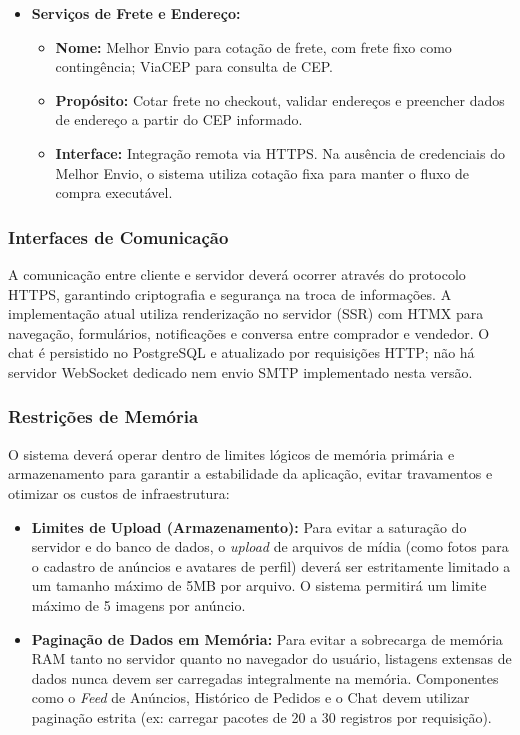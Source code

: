 ﻿\documentclass[12pt,a4paper]{article}
\begin{document}
\begin{itemize}
    \vspace{0.5em}

    \item \textbf{Serviços de Frete e Endereço:}
    \begin{itemize}
        \item[ ] \textbf{Nome:} Melhor Envio para cotação de frete, com frete fixo como contingência; ViaCEP para consulta de CEP.
        \item[ ] \textbf{Propósito:} Cotar frete no checkout, validar endereços e preencher dados de endereço a partir do CEP informado.
        \item[ ] \textbf{Interface:} Integração remota via HTTPS. Na ausência de credenciais do Melhor Envio, o sistema utiliza cotação fixa para manter o fluxo de compra executável.
    \end{itemize}
\end{itemize}

\subsubsection{Interfaces de Comunicação}
\label{sec:InterfaceComunicacao}

A comunicação entre cliente e servidor deverá ocorrer através do protocolo HTTPS, garantindo criptografia e segurança na troca de informações. A implementação atual utiliza renderização no servidor (SSR) com HTMX para navegação, formulários, notificações e conversa entre comprador e vendedor. O chat é persistido no PostgreSQL e atualizado por requisições HTTP; não há servidor WebSocket dedicado nem envio SMTP implementado nesta versão.

\subsubsection{Restrições de Memória}
\label{sec:RestricoesMemoria}

O sistema deverá operar dentro de limites lógicos de memória primária e armazenamento para garantir a estabilidade da aplicação, evitar travamentos e otimizar os custos de infraestrutura:

\begin{itemize}
    \item \textbf{Limites de Upload (Armazenamento):} Para evitar a saturação do servidor e do banco de dados, o \textit{upload} de arquivos de mídia (como fotos para o cadastro de anúncios e avatares de perfil) deverá ser estritamente limitado a um tamanho máximo de 5MB por arquivo. O sistema permitirá um limite máximo de 5 imagens por anúncio.
    
    
    \item \textbf{Paginação de Dados em Memória:} Para evitar a sobrecarga de memória RAM tanto no servidor quanto no navegador do usuário, listagens extensas de dados nunca devem ser carregadas integralmente na memória. Componentes como o \textit{Feed} de Anúncios, Histórico de Pedidos e o Chat devem utilizar paginação estrita (ex: carregar pacotes de 20 a 30 registros por requisição).
\end{itemize}
\end{document}
